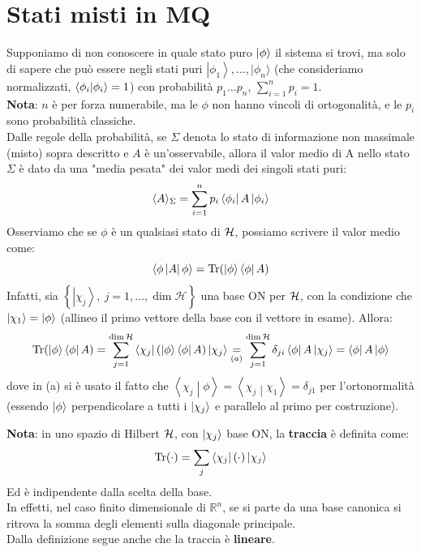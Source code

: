 \documentclass[../../FisicaTeorica.tex]{subfiles}
\begin{document}
\section{Stati misti in MQ}
Supponiamo di non conoscere in quale stato puro $\ket{\phi}$ il sistema si trovi, ma solo di sapere che può essere negli stati puri $\left|\phi_1\right\rangle,\dots, |\phi_n\rangle $ (che consideriamo normalizzati, $\braket{\phi_i|\phi_i}=1$) con probabilità $p_1\dots p_n$, $\sum_{i=1}^{n}p_i=1$.\\
\textbf{Nota}: $n$ è per forza numerabile, ma le $\phi$ non hanno vincoli di ortogonalità, e le $p_i$ sono probabilità classiche.\\
Dalle regole della probabilità, se $\Sigma$ denota lo stato di informazione non massimale (misto) sopra descritto e $A$ è un'osservabile, allora il valor medio di A nello stato $\Sigma$ è dato da una "media pesata" dei valor medi dei singoli stati puri:
\[
\langle A \rangle_\Sigma = \sum_{i=1}^n p_i\bra{\phi_i}A\ket{\phi_i}
\]
Osserviamo che se $\phi$ è un qualsiasi stato di $\mathcal{H}$, possiamo scrivere il valor medio come:
\[
\left\langle\phi\left|A\right|\phi\right\rangle
=\operatorname{Tr}(\ket{\phi}\bra{\phi}A)
\]
Infatti, sia $\left\{\left|\chi_j\right\rangle,\
j=1,\ldots,\dim{\mathcal{H}}\right\}$ una base ON per $\mathcal{H}$, con la condizione che $\left|\chi_1\right\rangle=\ket{\phi}$ (allineo il primo vettore della base con il vettore in esame). Allora:
\[
\operatorname{Tr}(\ket{\phi}\bra{\phi}A) = \sum_{j=1}^{\operatorname{dim}\mathcal{H}}\bra{\chi_j}(\ket{\phi}\bra{\phi}A)\ket{\chi_j} \underset{(a)}{=} \sum_{j=1}^{\operatorname{dim}\mathcal{H}}\delta_{ji}\bra{\phi}A\ket{\chi_j} = \bra{\phi}A\ket{\phi}
\]
dove in (a) si è usato il fatto che $\left\langle\chi_j\middle|\phi\right\rangle=\left\langle\chi_j\middle|\chi_1\right\rangle=\delta_{j1}$ per l'ortonormalità (essendo $\ket{\phi}$ perpendicolare a tutti i $\ket{\chi_j}$ e parallelo al primo per costruzione).
\begin{mdframed}[hidealllines=true,backgroundcolor=green!20,innerleftmargin=3pt,innerrightmargin=3pt,leftmargin=-3pt,rightmargin=-3pt]
\textbf{Nota}: in uno spazio di Hilbert\index{Traccia} $\mathcal{H}$, con $\ket{\chi_j}$ base ON, la \textbf{traccia} è definita come:
\[
\operatorname{Tr}(\cdot) = \sum_j \bra{\chi_j} (\cdot) \ket{\chi_j}
\]
Ed è indipendente dalla scelta della base.\\
In effetti, nel caso finito dimensionale di $\mathbb{R}^n$, se si parte da una base canonica si ritrova la somma degli elementi sulla diagonale principale.\\
Dalla definizione segue anche che la traccia è \textbf{lineare}.
\end{mdframed}
\end{document}
